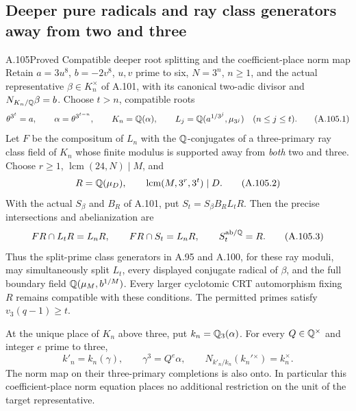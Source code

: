 \subsection{Deeper pure radicals and ray class generators away from two and three}

\begin{statement}{A.105}{Proved}
{Compatible deeper root splitting and the coefficient-place norm map}
Retain $a=3u^8$, $b=-2v^8$, $u,v$ prime to six,
$N=3^n$, $n\ge1$, and the actual representative
$\beta\in K_n^\times$ of A.101, with its canonical
two-adic divisor and $N_{K_n/\mathbb Q}\beta=b$.
Choose $t>n$, compatible roots
\[
 \theta^{3^t}=a,\qquad
 \alpha=\theta^{3^{t-n}},\qquad K_n=\mathbb Q(\alpha),
 \qquad L_j=\mathbb Q(a^{1/3^j},\mu_{3^j})\quad(n\le j\le t).
 \tag{A.105.1}
\]
Let $F$ be the compositum of $L_n$ with the
$\mathbb Q$-conjugates of a three-primary ray class field
of $K_n$ whose finite modulus is supported away
from \emph{both} two and three.
Choose $r\ge1$, $\operatorname{lcm}(24,N)\mid M$, and
\[
 R=\mathbb Q(\mu_D),\qquad
             \operatorname{lcm}(M,3^r,3^t)\mid D.
 \tag{A.105.2}
\]
With the actual $S_\beta$ and $B_R$ of A.101, put
$S_t=S_\beta B_RL_tR$.
Then the precise intersections and abelianization are
\[
 FR\cap L_tR=L_nR,\qquad
             FR\cap S_t=L_nR,\qquad S_t^{\rm ab/\mathbb Q}=R.
 \tag{A.105.3}
\]
Thus the split-prime class generators in A.95 and
A.100, for these ray moduli, may simultaneously split
$L_t$, every displayed conjugate radical of $\beta$,
and the full boundary field $\mathbb Q(\mu_M,b^{1/M})$.
Every larger cyclotomic CRT automorphism fixing $R$
remains compatible with these conditions.
The permitted primes satisfy $v_3(q-1)\ge t$.

At the unique place of $K_n$ above three, put
$k_n=\mathbb Q_3(\alpha)$.
For every $Q\in\mathbb Q^\times$ and integer $e$ prime to three,
\[
 k'_n=k_n(\gamma),\qquad\gamma^3=Q^e\alpha,
                  \qquad N_{k'_n/k_n}(k_n'{}^\times)=k_n^\times.
 \tag{A.105.4}
\]
The norm map on their three-primary completions is
also onto.
In particular this coefficient-place norm equation
places no additional restriction on the unit of the
target representative.
\end{statement}
